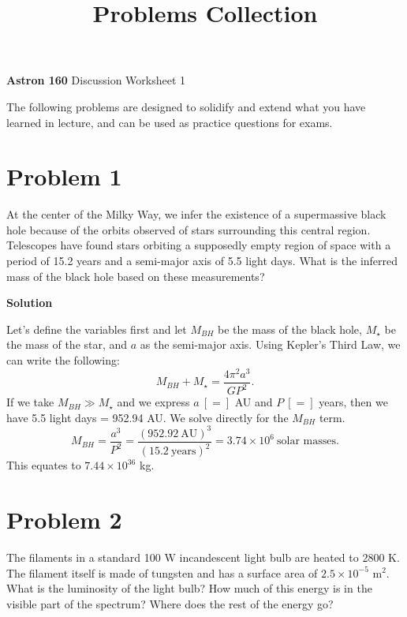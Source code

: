 \documentclass[12pt]{article}
\title{Problems Collection}
\begin{document}
\textbf{Astron 160} Discussion \hfill Worksheet 1
\vspace{-0.5cm}

\hrulefill

The following problems are designed to solidify and extend what you have learned in lecture, and can be used as practice questions for exams. 

\section*{Problem 1}
At the center of the Milky Way, we infer the existence of a supermassive black hole because of the orbits observed of stars surrounding this central region. Telescopes have found stars orbiting a supposedly empty region of space with a period of 15.2 years and a semi-major axis of 5.5 light days. What is the inferred mass of the black hole based on these measurements?

\vspace{0.5cm}
\begin{adjustwidth}{2.5em}{0pt}
\begin{siderules}
 {\color{cyan} \textbf{Solution}
 
 Let's define the variables first and let $M_{BH}$ be the mass of the black hole, $M_{\star}$ be the mass of the star, and $a$ as the semi-major axis. Using Kepler's Third Law, we can write the following:
 \begin{equation}
 M_{BH} + M_{\star} = \frac{4\pi^2 a^3}{GP^2}.
 \end{equation}
 If we take $M_{BH} \gg M_{\star}$ and we express $a \ [=]$ AU and $P \ [=]$ years, then we have 5.5 light days = 952.94 AU. We solve directly for the $M_{BH}$ term.
 \begin{equation}
 M_{BH} = \frac{a^3}{P^2} = \frac{(952.92 \ \text{AU})^3}{(15.2 \ \text{years})^2} = 3.74 \times 10^6 \ \text{solar masses}.
 \end{equation}
 This equates to $7.44 \times 10^{36}$ kg.
 }
\end{siderules}
\end{adjustwidth}

\section*{Problem 2}
The filaments in a standard 100 W incandescent light bulb are heated to 2800 K. The filament itself is made of tungsten and has a surface area of $2.5 \times 10^{-5}$ m$^2$. What is the luminosity of the light bulb? How much of this energy is in the visible part of the spectrum? Where does the rest of the energy go?
\end{document}
